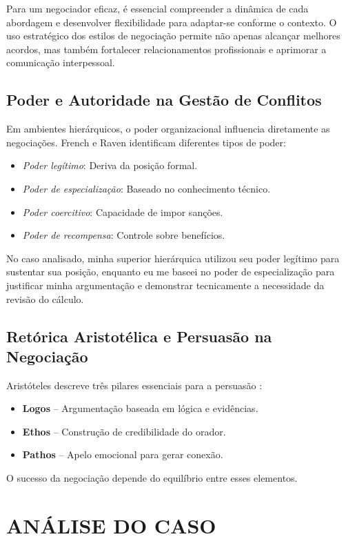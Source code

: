 \documentclass[article,12pt,oneside,a4paper]{article}
\begin{document}
Para um negociador eficaz, é essencial compreender a dinâmica de cada abordagem e desenvolver flexibilidade para adaptar-se conforme o contexto. O uso estratégico dos estilos de negociação permite não apenas alcançar melhores acordos, mas também fortalecer relacionamentos profissionais e aprimorar a comunicação interpessoal.
\subsection{Poder e Autoridade na Gestão de Conflitos}
\label{sec:orgc96864f}

Em ambientes hierárquicos, o poder organizacional influencia diretamente as negociações. French e Raven \cite{french1959bases} identificam diferentes tipos de poder:

\begin{itemize}
\item \emph{Poder legítimo}: Deriva da posição formal.
\item \emph{Poder de especialização}: Baseado no conhecimento técnico.
\item \emph{Poder coercitivo}: Capacidade de impor sanções.
\item \emph{Poder de recompensa}: Controle sobre benefícios.
\end{itemize}

No caso analisado, minha superior hierárquica utilizou seu poder legítimo para sustentar sua posição, enquanto eu me baseei no poder de especialização para justificar minha argumentação e demonstrar tecnicamente a necessidade da revisão do cálculo.
\subsection{Retórica Aristotélica e Persuasão na Negociação}
\label{sec:orgaf8294f}

Aristóteles descreve três pilares essenciais para a persuasão \cite{aristoteles2004retorica}:

\begin{itemize}
\item \textbf{Logos} – Argumentação baseada em lógica e evidências.
\item \textbf{Ethos} – Construção de credibilidade do orador.
\item \textbf{Pathos} – Apelo emocional para gerar conexão.
\end{itemize}

O sucesso da negociação depende do equilíbrio entre esses elementos.
\section{ANÁLISE DO CASO}
\label{sec:org01344e9}
\end{document}
